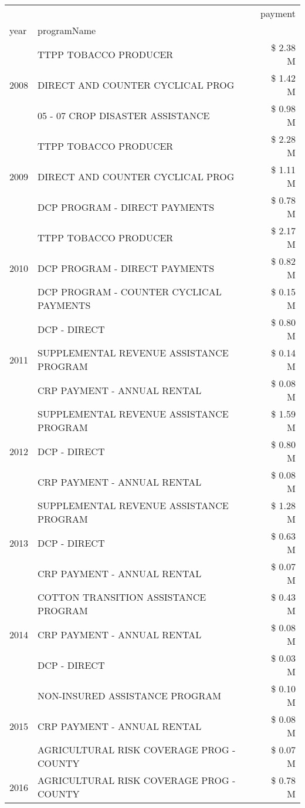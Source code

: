 \begin{tabular}{llr}
\toprule
 &  & payment \\
year & programName &  \\
\midrule
\multirow[t]{3}{*}{2008} & TTPP TOBACCO PRODUCER & \$ 2.38 M \\
 & DIRECT AND COUNTER CYCLICAL PROG & \$ 1.42 M \\
 & 05 - 07 CROP DISASTER ASSISTANCE & \$ 0.98 M \\
\cline{1-3}
\multirow[t]{3}{*}{2009} & TTPP TOBACCO PRODUCER & \$ 2.28 M \\
 & DIRECT AND COUNTER CYCLICAL PROG & \$ 1.11 M \\
 & DCP PROGRAM - DIRECT PAYMENTS & \$ 0.78 M \\
\cline{1-3}
\multirow[t]{3}{*}{2010} & TTPP TOBACCO PRODUCER & \$ 2.17 M \\
 & DCP PROGRAM - DIRECT PAYMENTS & \$ 0.82 M \\
 & DCP PROGRAM - COUNTER CYCLICAL PAYMENTS & \$ 0.15 M \\
\cline{1-3}
\multirow[t]{3}{*}{2011} & DCP - DIRECT & \$ 0.80 M \\
 & SUPPLEMENTAL REVENUE ASSISTANCE PROGRAM & \$ 0.14 M \\
 & CRP PAYMENT - ANNUAL RENTAL & \$ 0.08 M \\
\cline{1-3}
\multirow[t]{3}{*}{2012} & SUPPLEMENTAL REVENUE ASSISTANCE PROGRAM & \$ 1.59 M \\
 & DCP - DIRECT & \$ 0.80 M \\
 & CRP PAYMENT - ANNUAL RENTAL & \$ 0.08 M \\
\cline{1-3}
\multirow[t]{3}{*}{2013} & SUPPLEMENTAL REVENUE ASSISTANCE PROGRAM & \$ 1.28 M \\
 & DCP - DIRECT & \$ 0.63 M \\
 & CRP PAYMENT - ANNUAL RENTAL & \$ 0.07 M \\
\cline{1-3}
\multirow[t]{3}{*}{2014} & COTTON TRANSITION ASSISTANCE PROGRAM & \$ 0.43 M \\
 & CRP PAYMENT - ANNUAL RENTAL & \$ 0.08 M \\
 & DCP - DIRECT & \$ 0.03 M \\
\cline{1-3}
\multirow[t]{3}{*}{2015} & NON-INSURED ASSISTANCE PROGRAM & \$ 0.10 M \\
 & CRP PAYMENT - ANNUAL RENTAL & \$ 0.08 M \\
 & AGRICULTURAL RISK COVERAGE PROG - COUNTY & \$ 0.07 M \\
\cline{1-3}
\multirow[t]{3}{*}{2016} & AGRICULTURAL RISK COVERAGE PROG - COUNTY & \$ 0.78 M \\

\end{tabular}
